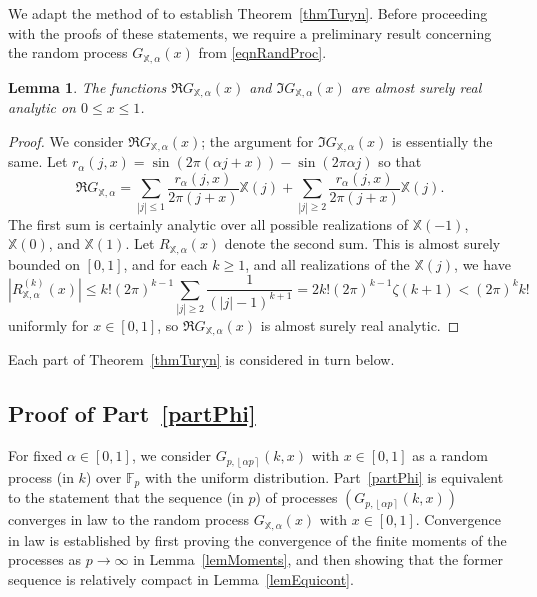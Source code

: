 \documentclass[reqno]{amsart}
\newtheorem{lemma}[theorem]{Lemma}
\numberwithin{equation}{section}
\numberwithin{table}{section}
\numberwithin{figure}{section}
\newcommand{\abs}[1]{\left\lvert#1\right\rvert}
\newcommand{\round}[1]{\left\lfloor#1\right\rceil}
\begin{document}
We adapt the method of \cite{KLM23} to establish Theorem~\ref{thmTuryn}.
Before proceeding with the proofs of these statements, we require a preliminary result concerning the random process $G_{\mathbb{X},\alpha}(x)$ from \eqref{eqnRandProc}.

\begin{lemma}\label{lemGXalpha}
The functions $\Re G_{\mathbb{X},\alpha}(x)$ and $\Im G_{\mathbb{X},\alpha}(x)$ are almost surely real analytic on $0\leq x\leq1$.
\end{lemma}

\begin{proof}
We consider $\Re G_{\mathbb{X},\alpha}(x)$; the argument for $\Im G_{\mathbb{X},\alpha}(x)$ is essentially the same.
Let $r_\alpha(j, x) = \sin(2\pi(\alpha j+x)) - \sin(2\pi\alpha j)$ so that
\[
\Re G_{\mathbb{X},\alpha} =
\sum_{\abs{j}\leq1} \frac{r_\alpha(j,x)}{2\pi(j+x)} \mathbb{X}(j)
+ \sum_{\abs{j}\geq2} \frac{r_\alpha(j,x)}{2\pi(j+x)} \mathbb{X}(j).
\]
The first sum is certainly analytic over all possible realizations of $\mathbb{X}(-1)$, $\mathbb{X}(0)$, and $\mathbb{X}(1)$.
Let $R_{\mathbb{X},\alpha}(x)$ denote the second sum.
This is almost surely bounded on $[0,1]$, and for each $k\geq1$, and all realizations of the $\mathbb{X}(j)$, we have
\[
\abs{R^{(k)}_{\mathbb{X},\alpha}(x)}
\leq
k! (2\pi)^{k-1} \sum_{\abs{j}\geq 2} \frac{1}{(\abs{j}-1)^{k+1}}
=
2k! (2\pi)^{k-1} \zeta(k+1)
<
(2\pi)^k k!
\]
uniformly for $x\in[0,1]$, so $\Re G_{\mathbb{X},\alpha}(x)$ is almost surely real analytic.
\end{proof}

Each part of Theorem~\ref{thmTuryn} is considered in turn below.

\subsection{Proof of Part~\ref{partPhi}}\label{subsecPartPhi}
For fixed $\alpha\in[0,1]$, we consider $G_{p,\round{\alpha p}}(k,x)$ with $x\in[0,1]$ as a random process (in $k$) over $\mathbb{F}_p$ with the uniform distribution.
Part~\ref{partPhi} is equivalent to the statement that the sequence (in $p$) of processes $(G_{p,\round{\alpha p}}(k,x))$ converges in law to the random process $G_{\mathbb{X},\alpha}(x)$ with $x\in[0,1]$.
Convergence in law is established by first proving the convergence of the finite moments of the processes as $p\to\infty$ in Lemma~\ref{lemMoments}, and then showing that the former sequence is relatively compact in Lemma~\ref{lemEquicont}.
\end{document}
